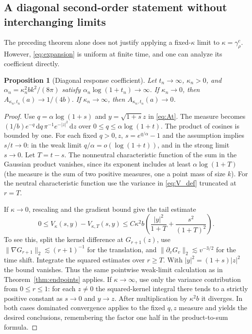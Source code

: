 \documentclass[11pt]{article}
\numberwithin{equation}{section}
\newtheorem{proposition}[theorem]{Proposition}
\theoremstyle{definition}
\theoremstyle{remark}
\newcommand{\dd}{\,\mathrm d}
\begin{document}
\subsection{A diagonal second-order statement without interchanging limits}
The preceding theorem alone does not justify applying a fixed-$\kappa$ limit to $\kappa=\gamma_\rho^c$. However, \eqref{eq:expansion} is uniform at finite time, and one can analyze its coefficient directly.
\begin{proposition}[Diagonal response coefficient]\label{prop:diagonal}
Let $t_n\to\infty$, $\kappa_n>0$, and $\alpha_n=\kappa_n^2bk^2/(8\pi)$ satisfy $\alpha_n\log(1+t_n)\to\infty$. If $\kappa_n\to0$, then $A_{\kappa_n,t_n}(a)\to 1/(4b)$. If $\kappa_n\to\infty$, then $A_{\kappa_n,t_n}(a)\to0$.
\end{proposition}
\begin{proof}
Use $q=\alpha\log(1+s)$ and $y=\sqrt{1+s}z$ in \eqref{eq:At}. The measure becomes $(1/b)e^{-q}\dd q\,\pi^{-1}e^{-|z|^2}\dd z$ over $0\le q\le\alpha\log(1+t)$. The product of cosines is bounded by one. For each fixed $q>0,z$, $s=e^{q/\alpha}-1$ and the assumption implies $s/t\to0$: in the weak limit $q/\alpha=o(\log(1+t))$, and in the strong limit $s\to0$. Let $T=t-s$. The nonneutral characteristic function of the sum in the Gaussian product vanishes, since its exponent includes at least $\alpha\log(1+T)$ (the measure is the sum of two positive measures, one a point mass of size $k$). For the neutral characteristic function use the variance in \eqref{eq:V_def} truncated at $r=T$.

If $\kappa\to0$, rescaling and the gradient bound give the tail estimate
\begin{equation}\label{eq:tailV}
 0\le V_\kappa(s,y)-V_{\kappa,T}(s,y)
 \le C\kappa^2 b\left(\frac{|y|^2}{1+T}+\frac{s^2}{(1+T)^2}\right).
\end{equation}
To see this, split the kernel difference at $G_{r+1}(z)$, use $\|\nabla G_{r+1}\|_2\lesssim(r+1)^{-1}$ for the translation, and $\|\partial_vG_v\|_2\lesssim v^{-3/2}$ for the time shift. Integrate the squared estimates over $r\ge T$. With $|y|^2=(1+s)|z|^2$ the bound vanishes. Thus the same pointwise weak-limit calculation as in Theorem~\ref{thm:endpoints} applies. If $\kappa\to\infty$, use only the variance contribution from $0\le r\le1$: for each $z\ne0$ the squared-kernel integral there tends to a strictly positive constant as $s\to0$ and $y\to z$. After multiplication by $\kappa^2b$ it diverges. In both cases dominated convergence applies to the fixed $q,z$ measure and yields the desired conclusions, remembering the factor one half in the product-to-sum formula.
\end{proof}
\end{document}
